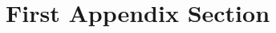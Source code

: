 
\Appendix
\label{ch:Appendix}


\section{First Appendix Section}
\label{sec:app-first-sections}





